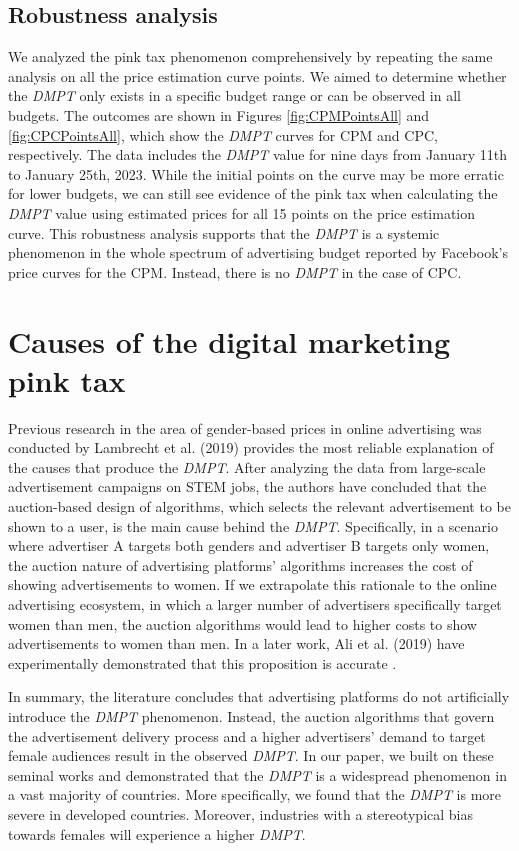 \documentclass[twocolumn]{bmcart}\usepackage{lineno}
\begin{document}
\subsection{Robustness analysis}
We analyzed the pink tax phenomenon comprehensively by repeating the same analysis on all the price estimation curve points. We aimed to determine whether the \emph{DMPT} only exists in a specific budget range or can be observed in all budgets. The outcomes are shown in Figures \ref{fig:CPMPointsAll} and \ref{fig:CPCPointsAll}, which show the \emph{DMPT} curves for CPM and CPC, respectively. The data includes the \emph{DMPT} value for nine days from January 11th to January 25th, 2023. While the initial points on the curve may be more erratic for lower budgets, we can still see evidence of the pink tax when calculating the \emph{DMPT} value using estimated prices for all 15 points on the price estimation curve.
This robustness analysis supports that the \emph{DMPT} is a systemic phenomenon in the whole spectrum of advertising budget reported by Facebook's price curves for the CPM. Instead, there is no \emph{DMPT} in the case of CPC.


\section{Causes of the digital marketing pink tax}
\color{blue}
Previous research in the area of gender-based prices in online advertising was conducted by Lambrecht et al. (2019) \cite{lambrecht2019algorithmic} provides the most reliable explanation of the causes that produce the \emph{DMPT}. After analyzing the data from large-scale advertisement campaigns on STEM jobs, the authors have concluded that the auction-based design of algorithms, which selects the relevant advertisement to be shown to a user, is the main cause behind the \emph{DMPT}. Specifically, in a scenario where advertiser A targets both genders and advertiser B targets only women, the auction nature of advertising platforms' algorithms increases the cost of showing advertisements to women. If we extrapolate this rationale to the online advertising ecosystem,  in which a larger number of advertisers specifically target women than men, the auction algorithms would lead to higher costs to show advertisements to women than men. In a later work, Ali et al. (2019) have experimentally demonstrated that this proposition is accurate \cite{ali2019discrimination}.

In summary, the literature concludes that advertising platforms do not artificially introduce the \emph{DMPT} phenomenon. Instead, the auction algorithms that govern the advertisement delivery process and a higher advertisers' demand to target female audiences result in the observed \emph{DMPT}.
In our paper, we built on these seminal works and demonstrated that the \emph{DMPT} is a widespread phenomenon in a vast majority of countries. More specifically, we found that the \emph{DMPT} is more severe in developed countries. Moreover, industries with a stereotypical bias towards females will experience a higher \emph{DMPT}. 
\end{document}
